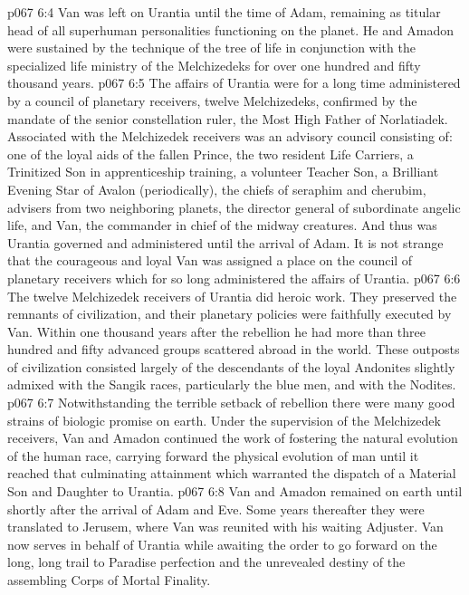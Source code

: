 \vs p067 6:4 Van was left on Urantia until the time of Adam, remaining as titular head of all superhuman personalities functioning on the planet. He and Amadon were sustained by the technique of the tree of life in conjunction with the specialized life ministry of the Melchizedeks for over one hundred and fifty thousand years.
\vs p067 6:5 \pc The affairs of Urantia were for a long time administered by a council of planetary receivers, twelve Melchizedeks, confirmed by the mandate of the senior constellation ruler, the Most High Father of Norlatiadek. Associated with the Melchizedek receivers was an advisory council consisting of: one of the loyal aids of the fallen Prince, the two resident Life Carriers, a Trinitized Son in apprenticeship training, a volunteer Teacher Son, a Brilliant Evening Star of Avalon (periodically), the chiefs of seraphim and cherubim, advisers from two neighboring planets, the director general of subordinate angelic life, and Van, the commander in chief of the midway creatures. And thus was Urantia governed and administered until the arrival of Adam. It is not strange that the courageous and loyal Van was assigned a place on the council of planetary receivers which for so long administered the affairs of Urantia.
\vs p067 6:6 The twelve Melchizedek receivers of Urantia did heroic work. They preserved the remnants of civilization, and their planetary policies were faithfully executed by Van. Within one thousand years after the rebellion he had more than three hundred and fifty advanced groups scattered abroad in the world. These outposts of civilization consisted largely of the descendants of the loyal Andonites slightly admixed with the Sangik races, particularly the blue men, and with the Nodites.
\vs p067 6:7 Notwithstanding the terrible setback of rebellion there were many good strains of biologic promise on earth. Under the supervision of the Melchizedek receivers, Van and Amadon continued the work of fostering the natural evolution of the human race, carrying forward the physical evolution of man until it reached that culminating attainment which warranted the dispatch of a Material Son and Daughter to Urantia.
\vs p067 6:8 \pc Van and Amadon remained on earth until shortly after the arrival of Adam and Eve. Some years thereafter they were translated to Jerusem, where Van was reunited with his waiting Adjuster. Van now serves in behalf of Urantia while awaiting the order to go forward on the long, long trail to Paradise perfection and the unrevealed destiny of the assembling Corps of Mortal Finality.
